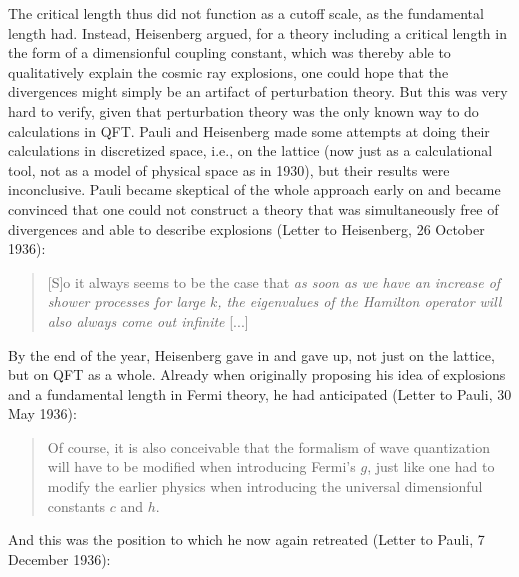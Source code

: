 \documentclass[12pt]{article}
\begin{document}
The critical length thus did not function as a cutoff scale, as the fundamental length had. Instead, Heisenberg argued, for a theory including a critical length in the form of a dimensionful coupling constant, which was thereby able to qualitatively explain the cosmic ray explosions, one could hope that the divergences might simply be an artifact of perturbation theory. But this was very hard to verify, given that perturbation theory was the only known way to do calculations in QFT. Pauli and Heisenberg made some attempts at doing their calculations in discretized space, i.e., on the lattice (now just as a calculational tool, not as a model of physical space as in 1930), but their results were inconclusive. Pauli became skeptical of the whole approach early on and became convinced that one could not construct a theory that was simultaneously free of divergences and able to describe explosions (Letter to Heisenberg, 26 October 1936):

\begin{quote}
[S]o it always seems to be the case that \emph{as soon as we have an increase of shower processes for large} $k$\emph{, the eigenvalues of the Hamilton operator will also always come out infinite} [...] 
\end{quote}

By the end of the year, Heisenberg gave in and gave up, not just on the lattice, but on QFT as a whole. Already when originally proposing his idea of explosions and a fundamental length in Fermi theory, he had anticipated (Letter to Pauli, 30 May 1936):

\begin{quote}
Of course, it is also conceivable that the formalism of wave quantization will have to be modified when introducing Fermi's $g$, just like one had to modify the earlier physics when introducing the universal dimensionful constants $c$ and $h$. 
\end{quote}

And this was the position to which he now again retreated (Letter to Pauli, 7 December 1936):
\end{document}

